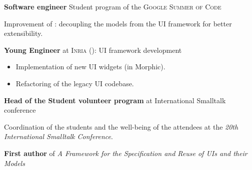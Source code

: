 \begin{rubric}{
}
 \textbf{Software engineer} Student program of the \textsc{Google Summer of Code}

\medskip

Improvement of : decoupling the models from the UI framework for better extensibility.



\entry*[March 2013] \textbf{Young Engineer} at \textsc{Inria} (): UI framework development

\begin{itemize}
    \item Implementation of new UI widgets (in Morphic).
    \item Refactoring of the legacy UI codebase.
\end{itemize}


\entry*[August 2012] \textbf{Head of the Student volunteer program} at International Smalltalk conference

\medskip

Coordination of the students and the well-being of the attendees at the \emph{20th International Smalltalk Conference}.


\entry*[August 2012] \textbf{First author} of \emph{A Framework for the Specification and Reuse of UIs and their Models}


\end{rubric}
